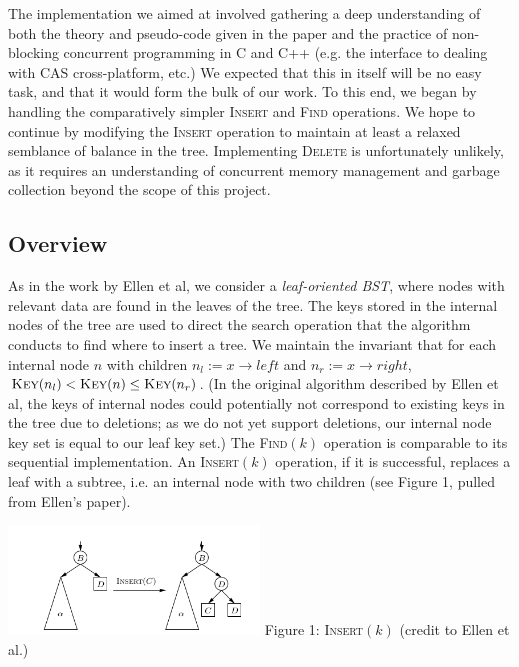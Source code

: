 \documentclass[10pt,pdftex,a4paper]{article}%
\begin{document}
\begin{multicols}{2}
The implementation we aimed at involved gathering a deep understanding of both the theory and pseudo-code given in the paper and the practice of non-blocking concurrent programming in C and C++ (e.g. the interface to dealing with CAS cross-platform, etc.)  We expected that this in itself will be no easy task, and that it would form the bulk of our work.  To this end, we began by handling the comparatively simpler \textsc{Insert} and \textsc{Find} operations.  We hope to continue by modifying the \textsc{Insert} operation to maintain at least a relaxed semblance of balance in the tree.  Implementing \textsc{Delete} is unfortunately unlikely, as it requires an understanding of concurrent memory management and garbage collection beyond the scope of this project.

\subsection{Overview}

As in the work by Ellen et al, we consider a \textit{leaf-oriented BST}, where nodes with relevant data are found in the leaves of the tree.  The keys stored in the internal nodes of the tree are used to direct the search operation that the algorithm conducts to find where to insert a tree.  We maintain the invariant that for each internal node $n$ with children $n_l := x\rightarrow left$ and $n_r := x\rightarrow right$, $\textsc{Key}(n_l) < \textsc{Key}(n) \leq \textsc{Key}(n_r)$.  (In the original algorithm described by Ellen et al, the keys of internal nodes could potentially not correspond to existing keys in the tree due to deletions; as we do not yet support deletions, our internal node key set is equal to our leaf key set.)  The \textsc{Find$(k)$} operation is comparable to its sequential implementation.  An \textsc{Insert$(k)$} operation, if it is successful, replaces a leaf with a subtree, i.e. an internal node with two children (see Figure 1, pulled from Ellen's paper).

\begin{center}
\includegraphics[width=0.5\textwidth]{insert.png}
Figure 1: \textsc{Insert$(k)$} (credit to Ellen et al.)
\end{center}


\end{multicols}
\end{document}
